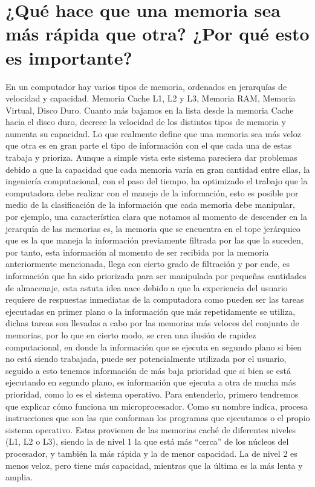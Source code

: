 \documentclass{article}
\begin{document}
\section{¿Qué hace que una memoria sea más rápida que otra? ¿Por qué esto es importante?}

En un computador hay varios tipos de memoria, ordenados en jerarquías de velocidad y capacidad. Memoria Cache L1, L2 y L3, Memoria RAM, Memoria Virtual, Disco Duro.\newline
Cuanto más bajamos en la lista desde la memoria Cache hacia el disco duro, decrece la velocidad de los distintos tipos de memoria y aumenta su capacidad.\newline
Lo que realmente define que una memoria sea más veloz que otra es en gran parte el tipo de información con el que cada una de estas trabaja y prioriza. Aunque a simple vista este sistema pareciera dar problemas debido a que la capacidad que cada memoria varía en gran cantidad entre ellas, la ingeniería computacional, con el paso del tiempo, ha optimizado el trabajo que la computadora debe realizar con el manejo de la información, esto es posible por medio de la clasificación de la información que cada memoria debe manipular, por ejemplo, una característica clara que notamos al momento de descender en la jerarquía de las memorias es, la memoria que se encuentra en el tope jerárquico que es la que maneja la información previamente filtrada por las que la suceden, por tanto, esta información al momento de ser recibida por la memoria anteriormente mencionada, llega con cierto grado de filtración y por ende, es información que ha sido priorizada para ser manipulada por pequeñas cantidades de almacenaje, esta astuta idea nace debido a que la experiencia del usuario requiere de respuestas inmediatas de la computadora como pueden ser las tareas ejecutadas en primer plano o la información que más repetidamente se utiliza, dichas tareas son llevadas a cabo por las memorias más veloces del conjunto de memorias, por lo que en cierto modo, se crea una ilusión de rapidez computacional, en donde la información que se ejecuta en segundo plano si bien no está siendo trabajada, puede ser potencialmente utilizada por el usuario, seguido a esto tenemos información de más baja prioridad que si bien se está ejecutando en segundo plano, es información que ejecuta a otra de mucha más prioridad, como lo es el sistema operativo.\cite{ref}\newline
Para entenderlo, primero tendremos que explicar cómo funciona un microprocesador. Como su nombre indica, procesa instrucciones que son las que conforman los programas que ejecutamos o el propio sistema operativo. Estas provienen de las memorias caché de diferentes niveles (L1, L2 o L3), siendo la de nivel 1 la que está más “cerca” de los núcleos del procesador, y también la más rápida y la de menor capacidad. La de nivel 2 es menos veloz, pero tiene más capacidad, mientras que la última es la más lenta y amplia.\newline
\end{document}
